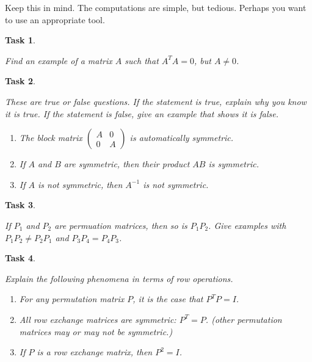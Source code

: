 \documentclass[10pt,]{book}
\theoremstyle{plain}
\numberwithin{equation}{section}
\newtheorem{task}{Task}[chapter]
\begin{document}
      Keep this in mind. The computations are simple, but tedious.
      Perhaps you want to use an appropriate tool.
\begin{task}
\label{task-76}

        Find an example of a matrix \(A\) such that \(A^T A = 0\),
        but \(A \neq 0\).
      \end{task}
\begin{task}
\label{task-77}

        These are true or false questions. If the statement is true, explain why
        you know it is true. If the statement is false, give an example that
        shows it is false.
        \begin{enumerate}
\item{}
            The block matrix \(\left( \begin{smallmatrix} A & 0 \\
            0 & A \end{smallmatrix}\right)\) is automatically symmetric.
          \item{}
            If \(A\) and \(B\) are symmetric, then their product \(AB\)
            is symmetric.
          \item{}
            If \(A\) is not symmetric, then \(A^{-1}\) is not symmetric.
          \end{enumerate}
\end{task}
\begin{task}
\label{task-78}

        If \(P_1\) and \(P_2\) are permuation matrices, then so is
        \(P_1P_2\). Give examples with \(P_1P_2 \neq P_2P_1\) and
        \(P_3P_4 = P_4P_3\).
      \end{task}
\begin{task}
\label{task-79}

        Explain the following phenomena in terms of row operations.
        \begin{enumerate}
\item{}
            For any permutation matrix \(P\), it is the case that
            \(P^T P = I\).
          \item{}
            All row exchange matrices are symmetric: \(P^T = P\).
            (other permutation matrices may or may not be symmetric.)
          \item{}
            If \(P\) is a row exchange matrix, then \(P^2 = I\).
          \end{enumerate}
\end{task}
\end{document}
